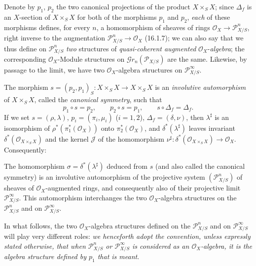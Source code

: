 \begin{env}[16.3.2]
\label{IV.16.3.2}
Denote by $p_1$, $p_2$ the two canonical projections of the product $X\times_S X$;
since $\Delta_f$ is an $X$-section of $X\times_S X$ for both of the
morphisms $p_1$ and $p_2$, \emph{each} of these morphisms defines, for every $n$, a
homomorphism of sheaves of rings $\mathcal{O}_X\to\mathscr{P}_{X/S}^n$,
right inverse to the augmentation $\mathscr{P}_{X/S}^n\to\mathcal{O}_X$
(16.1.7); we can also say that we thus define on
$\mathscr{P}_{X/S}^n$ \emph{two} structures of \emph{quasi-coherent augmented}
$\mathcal{O}_X$-\emph{algebra}; the corresponding $\mathcal{O}_X$-Module structures on
$\mathscr{G}r_n(\mathscr{P}_{X/S})$ are the same. Likewise, by passage to
the limit, we have two $\mathcal{O}_X$-algebra structures on
$\mathscr{P}_{X/S}^\infty$.
\end{env}

\begin{env}[16.3.3]\label{IV.16.3.3}
The morphism $s=(p_2,p_1)_S:X\times_S X\to X\times_S X$ is an \emph{involutive
automorphism} of $X\times_S X$, called the \emph{canonical symmetry}, such that
\[
  p_1\circ s=p_2,\qquad p_2\circ s=p_1,\qquad s\circ\Delta_f=\Delta_f.
  \tag{16.3.3.1}
  \label{IV.16.3.3.1}
\]
If we set $s=(\rho,\lambda)$, $p_i=(\pi_i,\mu_i)$ ($i=1,2$),
$\Delta_f=(\delta,\nu)$, then $\lambda^\sharp$ is an isomorphism of
$\rho^*(\pi_1^*(\mathcal{O}_X))$ onto $\pi_2^*(\mathcal{O}_X)$, and
$\delta^*(\lambda^\sharp)$ leaves invariant $\delta^*(\mathcal{O}_{X\times_S X})$
and the kernel $\mathscr{J}$ of the homomorphism
$\nu^\sharp:\delta^*(\mathcal{O}_{X\times_S X})\to\mathcal{O}_X$. Consequently:
\end{env}

\begin{proposition}[16.3.4]\label{IV.16.3.4}
The homomorphism $\sigma=\delta^*(\lambda^\sharp)$ deduced from $s$ \textup{(and also called}
the canonical symmetry\textup{)} is an involutive automorphism of the projective system
$(\mathscr{P}_{X/S}^n)$ of sheaves
of $\mathcal{O}_X$-augmented rings, and consequently also of their projective limit
$\mathscr{P}_{X/S}^\infty$. This automorphism interchanges the two
$\mathcal{O}_X$-algebra structures on the $\mathscr{P}_{X/S}^n$ and on
$\mathscr{P}_{X/S}^\infty$.
\end{proposition}

\begin{env}[16.3.5]
\label{IV.16.3.5}
In what follows, the two $\mathcal{O}_X$-algebra structures defined on the
$\mathscr{P}_{X/S}^n$ and on $\mathscr{P}_{X/S}^\infty$ will play very
different roles: \emph{we henceforth adopt the convention, unless expressly stated
otherwise, that when $\mathscr{P}_{X/S}^n$ or $\mathscr{P}_{X/S}^\infty$ is
considered as an $\mathcal{O}_X$-algebra, it is the algebra structure defined by
$p_1$ that is meant}.
\end{env}

